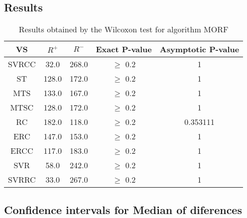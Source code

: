\documentclass[a4paper,10pt]{article}
\begin{document}
\subsection{Results}

\begin{table}[!htp]
\centering\small
\begin{tabular}{
|c|c|c|c|c|}
\hline
 VS & $R^{+}$ & $R^{-}$ & Exact P-value & Asymptotic P-value \\ \hline 
SVRCC & 32.0 & 268.0 & $\geq$ 0.2 & 1\\ \hline 
ST & 128.0 & 172.0 & $\geq$ 0.2 & 1\\ \hline 
MTS & 133.0 & 167.0 & $\geq$ 0.2 & 1\\ \hline 
MTSC & 128.0 & 172.0 & $\geq$ 0.2 & 1\\ \hline 
RC & 182.0 & 118.0 & $\geq$ 0.2 & 0.353111\\ \hline 
ERC & 147.0 & 153.0 & $\geq$ 0.2 & 1\\ \hline 
ERCC & 117.0 & 183.0 & $\geq$ 0.2 & 1\\ \hline 
SVR & 58.0 & 242.0 & $\geq$ 0.2 & 1\\ \hline 
SVRRC & 33.0 & 267.0 & $\geq$ 0.2 & 1\\ \hline 

\end{tabular}
\caption{Results obtained by the Wilcoxon test for algorithm MORF}
\end{table}

\subsection{Confidence intervals for Median of diferences}
\end{document}
